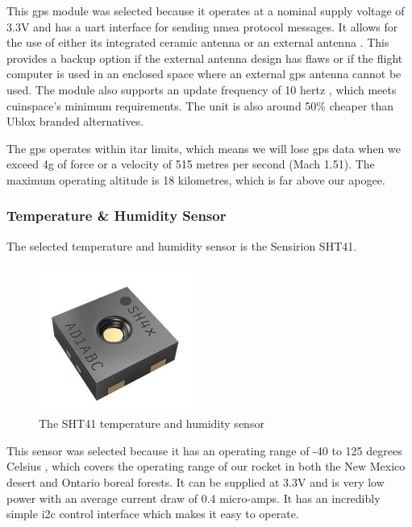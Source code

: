 This \gls{gps} module was selected because it operates at a nominal supply voltage of 3.3V \cite{gps-datasheet} and has
a \gls{uart} interface for sending \gls{nmea} protocol messages. \cite{gps-datasheet} It allows for the use of either
its integrated ceramic antenna or an external antenna \cite{gps-datasheet}. This provides a backup option if the
external antenna design has flaws or if the flight computer is used in an enclosed space where an external \gls{gps}
antenna cannot be used. The module also supports an update frequency of 10 hertz \cite{gps-datasheet}, which meets
\gls{cuinspace}'s minimum requirements. The unit is also around 50\% cheaper than Ublox branded alternatives.

The \gls{gps} operates within \gls{itar} limits, which means we will lose \gls{gps} data when we exceed 4g of force or
a velocity of 515 metres per second (Mach 1.51). The maximum operating altitude is 18 kilometres, which is far above our
\gls{apogee}.

\subsubsection{Temperature \& Humidity Sensor}

The selected temperature and humidity sensor is the Sensirion SHT41.

\begin{figure}[H]
    \centering
    \includegraphics[width=2in]{assets/images/sht41.jpg}
    \caption{The SHT41 temperature and humidity sensor \cite{sht41-pic}}
\end{figure}

This sensor was selected because it has an operating range of -40 to 125 degrees Celsius \cite[1]{sht4x-datasheet},
which covers the operating range of our rocket in both the New Mexico desert and Ontario boreal forests. It can be
supplied at 3.3V \cite[1]{sht4x-datasheet} and is very low power with an average current draw of 0.4 micro-amps.
\cite[1]{sht4x-datasheet} It has an incredibly simple \gls{i2c} control interface which makes it easy to operate.
\cite[Sec. 4.5]{sht4x-datasheet}

